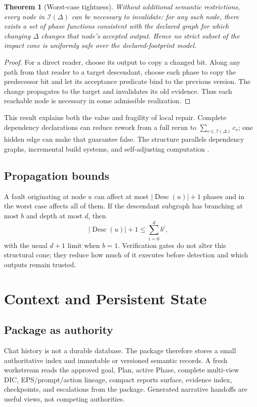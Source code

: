 \documentclass[11pt]{article}
\newtheorem{theorem}[definition]{Theorem}
\newcommand{\Desc}{\operatorname{Desc}}
\begin{document}
\begin{theorem}[Worst-case tightness]
\label{thm:tight}
Without additional semantic restrictions, every node in $\mathcal I(\Delta)$ can be necessary to invalidate: for any such node, there exists a set of phase functions consistent with the declared graph for which changing $\Delta$ changes that node's accepted output. Hence no strict subset of the impact cone is uniformly safe over the declared-footprint model.
\end{theorem}
\begin{proof}
For a direct reader, choose its output to copy a changed bit. Along any path from that reader to a target descendant, choose each phase to copy the predecessor bit and let its acceptance predicate bind to the previous version. The change propagates to the target and invalidates its old evidence. Thus each reachable node is necessary in some admissible realization.
\end{proof}
This result explains both the value and fragility of local repair. Complete dependency declarations can reduce rework from a full rerun to $\sum_{v\in\mathcal I(\Delta)}c_v$; one hidden edge can make that guarantee false. The structure parallels dependency graphs, incremental build systems, and self-adjusting computation \citep{mckinley1994programdependence,mokhov2018build,acar2009selfadjusting}.

\subsection{Propagation bounds}
A fault originating at node $u$ can affect at most $|\Desc(u)|+1$ phases and in the worst case affects all of them. If the descendant subgraph has branching at most $b$ and depth at most $d$, then
\[
|\Desc(u)|+1\le \sum_{i=0}^{d}b^i,
\]
with the usual $d+1$ limit when $b=1$. Verification gates do not alter this structural cone; they reduce how much of it executes before detection and which outputs remain trusted.

\section{Context and Persistent State}
\subsection{Package as authority}
Chat history is not a durable database. The package therefore stores a small authoritative index and immutable or versioned semantic records. A fresh workstream reads the approved goal, Plan, active Phase, complete multi-view DIC, EPS/prompt/action lineage, compact reports surface, evidence index, checkpoints, and escalations from the package. Generated narrative handoffs are useful views, not competing authorities.
\end{document}
